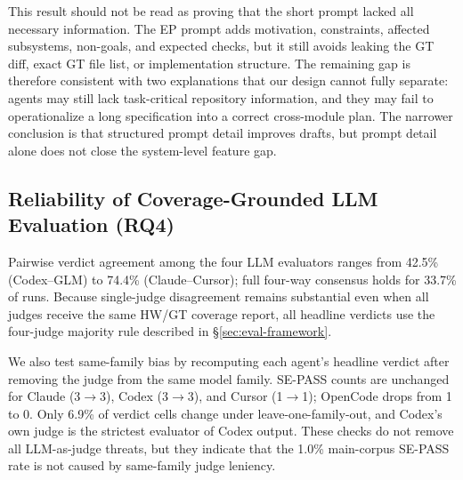 This result should not be read as proving that the short prompt lacked all necessary information. The EP prompt adds motivation, constraints, affected subsystems, non-goals, and expected checks, but it still avoids leaking the GT diff, exact GT file list, or implementation structure. The remaining gap is therefore consistent with two explanations that our design cannot fully separate: agents may still lack task-critical repository information, and they may fail to operationalize a long specification into a correct cross-module plan. The narrower conclusion is that structured prompt detail improves drafts, but prompt detail alone does not close the system-level feature gap.


\subsection{Reliability of Coverage-Grounded LLM Evaluation (RQ4)}
\label{sec:results-agreement}

Pairwise verdict agreement among the four LLM evaluators ranges from 42.5\% (Codex--GLM) to 74.4\% (Claude--Cursor); full four-way consensus holds for 33.7\% of runs. Because single-judge disagreement remains substantial even when all judges receive the same HW/GT coverage report, all headline verdicts use the four-judge majority rule described in \S\ref{sec:eval-framework}.

\par\noindent{}\par

We also test same-family bias by recomputing each agent's headline verdict after removing the judge from the same model family. SE-PASS counts are unchanged for Claude (3$\to$3), Codex (3$\to$3), and Cursor (1$\to$1); OpenCode drops from 1 to 0. Only 6.9\% of verdict cells change under leave-one-family-out, and Codex's own judge is the strictest evaluator of Codex output. These checks do not remove all LLM-as-judge threats, but they indicate that the 1.0\% main-corpus SE-PASS rate is not caused by same-family judge leniency.

